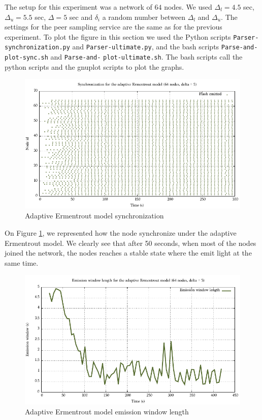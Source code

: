 \documentclass[a4paper, 11pt]{article}
\theoremstyle{plain}
\theoremstyle{definition}
\begin{document}
     The setup for this experiment was a network of $64$ nodes. We used $\Delta_l = 4.5$ sec, $\Delta_u = 5.5$
     sec, $\Delta = 5$ sec and $\delta_i$ a random number between $\Delta_l$ and $\Delta_u$. The settings for
     the peer sampling service are the same as for the previous experiment. To plot the figure in
     this section we used the Python scripts \texttt{Parser-synchronization.py} and
     \texttt{Parser-ultimate.py}, and the bash scripts \texttt{Parse-and-plot-sync.sh} and
     \texttt{Parse-and-} \texttt{plot-ultimate.sh}. The bash scripts call the python scripts and the gnuplot scripts to
     plot the graphs.
     
     \begin{figure}[h]
       \centering
       \includegraphics[width=\textwidth]{../Plots/Firefly-er-64nodes-d5-2.pdf}
       \caption{Adaptive Ermentrout model synchronization}
       \label{fig:er-sync}
     \end{figure}


     On Figure \ref{fig:er-sync}, we represented how the node synchronize under the adaptive Ermentrout
     model. We clearly see that after 50 seconds, when most of the nodes joined the network, the nodes reaches
     a stable state where the emit light at the same time.

     \begin{figure}[h]
       \centering
       \includegraphics[width=\textwidth]{../Plots/Firefly-er-64nodes-d5-2-ewl.pdf}
       \caption{Adaptive Ermentrout model emission window length}
       \label{fig:er-ewl}
     \end{figure}
\end{document}

